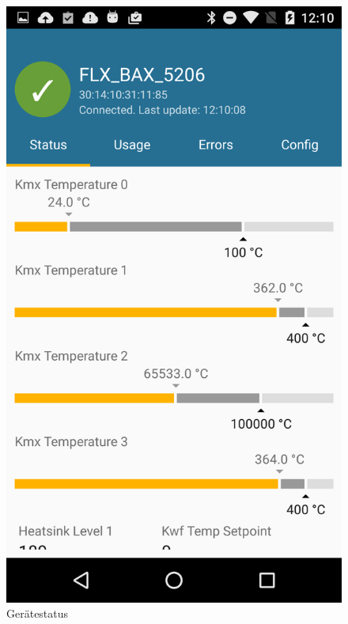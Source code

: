 \begin{figure}
	\vspace{0.7cm}
	\includegraphics[scale=0.13]{results/res/device_status}
	\caption{Gerätestatus}
\end{figure}
\
